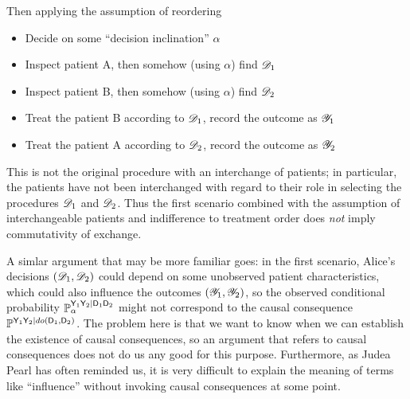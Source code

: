 Then applying the assumption of reordering

\begin{itemize}
    \item Decide on some ``decision inclination'' $\alpha$
    \item Inspect patient A, then somehow (using $\alpha$) find $\mathscr{D}_1$
    \item Inspect patient B, then somehow (using $\alpha$) find $\mathscr{D}_2$
    \item Treat the patient B according to $\mathscr{D}_1$, record the outcome as $\mathscr{Y}_1$
    \item Treat the patient A according to $\mathscr{D}_2$, record the outcome as $\mathscr{Y}_2$
\end{itemize}

This is not the original procedure with an interchange of patients; in particular, the patients have not been interchanged with regard to their role in selecting the procedures $\mathscr{D}_1$ and $\mathscr{D}_2$. Thus the first scenario combined with the assumption of interchangeable patients and indifference to treatment order does \emph{not} imply commutativity of exchange.

A simlar argument that may be more familiar goes: in the first scenario, Alice's decisions $(\mathscr{D}_1,\mathscr{D}_2)$ could depend on some unobserved patient characteristics, which could also influence the outcomes $(\mathscr{Y}_1,\mathscr{Y}_2)$, so the observed conditional probability $\mathbb{P}_\alpha^{\mathsf{Y}_1\mathsf{Y}_2|\mathsf{D}_1\mathsf{D}_2}$ might not correspond to the causal consequence $\mathbb{P}^{\mathsf{Y}_1\mathsf{Y}_2|do(\mathsf{D}_1,\mathsf{D}_2)}$. The problem here is that we want to know when we can establish the existence of causal consequences, so an argument that refers to causal consequences does not do us any good for this purpose. Furthermore, as Judea Pearl has often reminded us, it is very difficult to explain the meaning of terms like ``influence'' without invoking causal consequences at some point.


